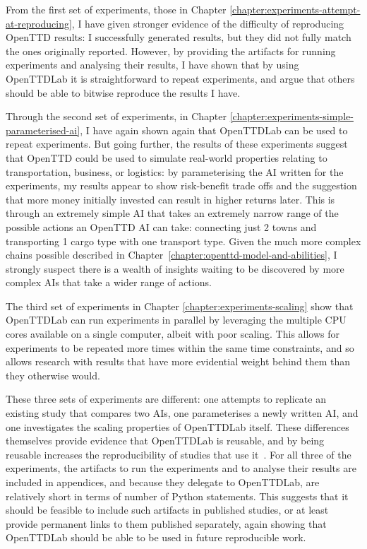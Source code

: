 \documentclass[logo,msc,dsti]{style/infthesis}    %
\begin{document}
{From the first set of experiments, those in Chapter \ref{chapter:experiments-attempt-at-reproducing}, I have given stronger evidence of the difficulty of reproducing OpenTTD results: I successfully generated results, but they did not fully match the ones originally reported. However, by providing the artifacts for running experiments and analysing their results, I have shown that by using OpenTTDLab it is straightforward to repeat experiments, and argue that others should be able to bitwise reproduce the results I have.

Through the second set of experiments, in Chapter \ref{chapter:experiments-simple-parameterised-ai}, I have again shown again that OpenTTDLab can be used to repeat experiments. But going further, the results of these experiments suggest that OpenTTD could be used to simulate real-world properties relating to transportation, business, or logistics: by parameterising the AI written for the experiments, my results appear to show risk-benefit trade offs and the suggestion that more money initially invested can result in higher returns later. This is through an extremely simple AI that takes an extremely narrow range of the possible actions an OpenTTD AI can take: connecting just 2 towns and transporting 1 cargo type with one transport type. Given the much more complex chains possible described in Chapter~\ref{chapter:openttd-model-and-abilities}, I strongly suspect there is a wealth of insights waiting to be discovered by more complex AIs that take a wider range of actions.

The third set of experiments in Chapter \ref{chapter:experiments-scaling} show that OpenTTDLab can run experiments in parallel by leveraging the multiple CPU cores available on a single computer, albeit with poor scaling. This allows for experiments to be repeated more times within the same time constraints, and so allows research with results that have more evidential weight behind them than they otherwise would.

These three sets of experiments are different: one attempts to replicate an existing study that compares two AIs, one parameterises a newly written AI, and one investigates the scaling properties of OpenTTDLab itself. These differences themselves provide evidence that OpenTTDLab is reusable, and by being reusable increases the reproducibility of studies that use it~\cite{benureau2018re}. For all three of the experiments, the artifacts to run the experiments and to analyse their results are included in appendices, and because they delegate to OpenTTDLab, are relatively short in terms of number of Python statements. This suggests that it should be feasible to include such artifacts in published studies, or at least provide permanent links to them published separately, again showing that OpenTTDLab should be able to be used in future reproducible work.

}
\end{document}
